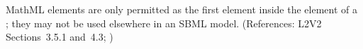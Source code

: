 MathML  elements are only permitted as the first element
inside the  element of a \FunctionDefinition {}; they may not be used
elsewhere in an SBML model.  (References: L2V2 Sections~3.5.1 and~4.3;
)

